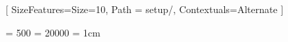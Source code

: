 \setmonofont{FiraCode-Regular.ttf}[
	SizeFeatures={Size=10},
	Path = setup/,
	Contextuals=Alternate
]


\renewcommand*\cfttoctitlefont{\normalfont\bfseries\MakeUppercase}
\renewcommand{\cftsecfont}{}
\renewcommand{\cftsecpagefont}{}


\tolerance = 500
\hyphenpenalty = 20000
\emergencystretch = 1cm